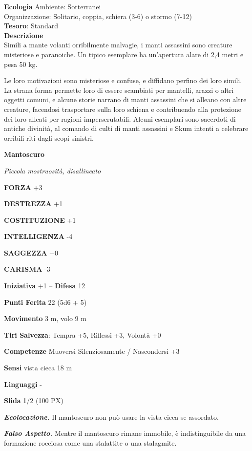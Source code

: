 \begin{multicols}{2}
	\textbf{Ecologia}
	Ambiente: Sotterranei\\
	Organizzazione: Solitario, coppia, schiera (3-6) o stormo (7-12)\\
	\textbf{Tesoro}: Standard\\
	\textbf{Descrizione}\\
	Simili a mante volanti orribilmente malvagie, i manti assassini sono creature misteriose e paranoiche. Un tipico esemplare ha un'apertura alare di 2,4 metri e pesa 50 kg.

	Le loro motivazioni sono misteriose e confuse, e diffidano perfino dei loro simili. La strana forma permette loro di essere scambiati per mantelli, arazzi o altri oggetti comuni, e alcune storie narrano di manti assassini che si alleano con altre creature, facendosi trasportare sulla loro schiena e contribuendo alla protezione dei loro alleati per ragioni imperscrutabili. Alcuni esemplari sono sacerdoti di antiche divinità, al comando di culti di manti assassini e Skum intenti a celebrare orribili riti dagli scopi sinistri.


	\medskip{}\textbf{Mantoscuro}

	\textit{Piccola mostruosità, disallineato}

	\textbf{FORZA} +3

	\textbf{DESTREZZA} +1

	\textbf{COSTITUZIONE} +1

	\textbf{INTELLIGENZA} -4

	\textbf{SAGGEZZA} +0

	\textbf{CARISMA} -3

	\textbf{Iniziativa} +1 -- \textbf{Difesa} 12

	\textbf{Punti Ferita} 22 (5d6 + 5)

	\textbf{Movimento} 3 m, volo 9 m

	\textbf{Tiri Salvezza}: Tempra +5, Riflessi +3, Volontà +0

	\textbf{Competenze} Muoversi Silenziosamente / Nascondersi +3

	\textbf{Sensi} vista cieca 18 m

	\textbf{Linguaggi} -

	\textbf{Sfida} 1/2 (100 PX)

	\textit{\textbf{Ecolocazione.}} Il mantoscuro non può usare la vista cieca se assordato.

	\textit{\textbf{Falso Aspetto.}} Mentre il mantoscuro rimane immobile, è indistinguibile da una formazione rocciosa come una stalattite o una stalagmite.


\end{multicols}
